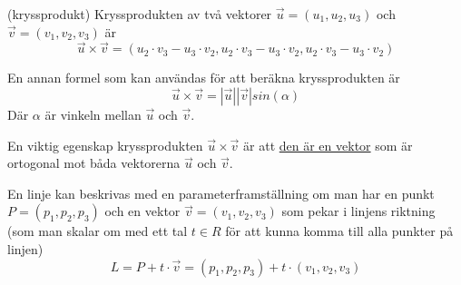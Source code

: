 \documentclass[../main.tex]{subfiles}
\begin{document}
\begin{formel}{(kryssprodukt)}
\label{kryssprod} 
Kryssprodukten av två vektorer $\vec{u} = (u_1, u_2, u_3)$ och $\vec{v} = (v_1, v_2, v_3)$ är
\[\vec{u}\times \vec{v} = (u_2\cdot v_3 - u_3\cdot v_2, u_2\cdot v_3 - u_3\cdot v_2, u_2\cdot v_3 - u_3\cdot v_2)\]

En annan formel som kan användas för att beräkna kryssprodukten är
\[\vec{u}\times \vec{v} = |\vec{u}||\vec{v}|sin(\alpha)\]
Där $\alpha$ är vinkeln mellan $\vec{u}$ och $\vec{v}$.

En viktig egenskap kryssprodukten $\vec{u}\times\vec{v}$ är att \underline{den är en vektor} som är ortogonal mot båda vektorerna $\vec{u}$ och $\vec{v}$.
\end{formel}


\begin{formel}
\label{parameterlinje} 
En linje kan beskrivas med en parameterframställning om man har en punkt $P = (p_1, p_2, p_3)$ och en vektor $\vec{v}=(v_1, v_2, v_3)$ som pekar i linjens riktning (som man skalar om med ett tal $t \in R$ för att kunna komma till alla punkter på linjen)
\[L = P + t \cdot \vec{v} = (p_1, p_2, p_3) + t\cdot (v_1, v_2, v_3)\]
\end{formel}
\end{document}
